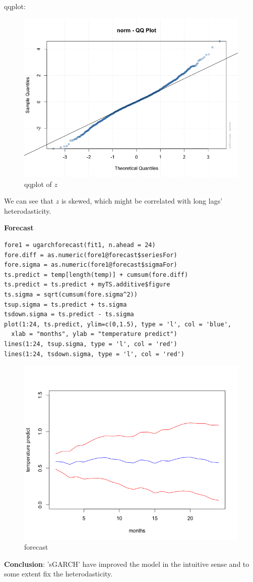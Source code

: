 \documentclass[a4paper, 11pt]{article}
\begin{document}
qqplot:
\begin{figure}[H]
\centering
\caption{qqplot of $z$}
\includegraphics[scale=.60]{qqplot.png}
\end{figure}

\indent We can see that $z$ is skewed, which might be correlated with long lags' heterodasticity.\par

\textbf{Forecast}

\begin{verbatim}
fore1 = ugarchforecast(fit1, n.ahead = 24)
fore.diff = as.numeric(fore1@forecast$seriesFor)
fore.sigma = as.numeric(fore1@forecast$sigmaFor)
ts.predict = temp[length(temp)] + cumsum(fore.diff)
ts.predict = ts.predict + myTS.additive$figure
ts.sigma = sqrt(cumsum(fore.sigma^2))
tsup.sigma = ts.predict + ts.sigma
tsdown.sigma = ts.predict - ts.sigma
plot(1:24, ts.predict, ylim=c(0,1.5), type = 'l', col = 'blue',
  xlab = "months", ylab = "temperature predict")
lines(1:24, tsup.sigma, type = 'l', col = 'red')
lines(1:24, tsdown.sigma, type = 'l', col = 'red')
\end{verbatim}

\begin{figure}[H]
\centering
\caption{forecast}
\includegraphics[scale=.60]{predict01.png}
\end{figure}


\textbf{Conclusion}: 'sGARCH' have improved the model in the intuitive sense and to some extent fix the heterodasticity. 
\end{document}
